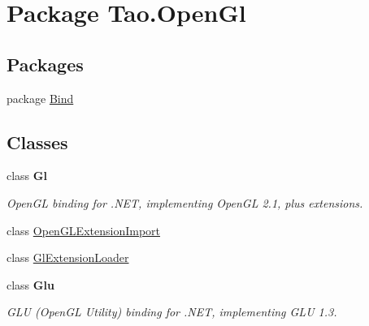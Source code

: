 \hypertarget{namespace_tao_1_1_open_gl}{
\section{Package Tao.OpenGl}
\label{namespace_tao_1_1_open_gl}
}
\subsection*{Packages}
\begin{DoxyCompactItemize}
\item 
package \hyperlink{namespace_tao_1_1_open_gl_1_1_bind}{Bind}
\end{DoxyCompactItemize}
\subsection*{Classes}
\begin{DoxyCompactItemize}
\item 
class {\bfseries Gl}
\begin{DoxyCompactList}\small\item\em OpenGL binding for .NET, implementing OpenGL 2.1, plus extensions. \item\end{DoxyCompactList}\item 
class \hyperlink{class_tao_1_1_open_gl_1_1_open_g_l_extension_import}{OpenGLExtensionImport}
\item 
class \hyperlink{class_tao_1_1_open_gl_1_1_gl_extension_loader}{GlExtensionLoader}
\item 
class {\bfseries Glu}
\begin{DoxyCompactList}\small\item\em GLU (OpenGL Utility) binding for .NET, implementing GLU 1.3. \item\end{DoxyCompactList}\end{DoxyCompactItemize}
